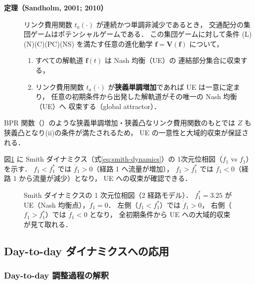 \begin{description}
  \item[\textbf{定理（Sandholm, 2001; 2010）}]
    リンク費用関数 $t_a(\cdot)$ が連続かつ単調非減少であるとき，
    交通配分の集団ゲームはポテンシャルゲームである．
    この集団ゲームに対して条件 (L)(N)(C)(PC)(NS) を満たす任意の進化動学
    $\dot{\boldsymbol{f}} = \boldsymbol{V}(\boldsymbol{f})$ について，
    \begin{enumerate}
      \item すべての解軌道 $\boldsymbol{f}(t)$ は Nash 均衡（UE）の
            連結部分集合に収束する，
      \item リンク費用関数 $t_a(\cdot)$ が\textbf{狭義単調増加}であれば
            UE は一意に定まり，
            任意の初期条件から出発した解軌道がその唯一の Nash 均衡（UE）へ
            収束する（global attractor）．
    \end{enumerate}
    \cite{Sandholm2001,Sandholm2010}
\end{description}

BPR 関数（）のような狭義単調増加・狭義凸なリンク費用関数のもとでは
$Z$ も狭義凸となり(ii)の条件が満たされるため，
UE の一意性と大域的収束が保証される\cite{土木学会1998}．

図\ref{fig:smith-dynamics} に Smith ダイナミクス（式\eqref{eq:smith-dynamics}）の
1次元位相図（$\dot{f}_1$ vs $f_1$）を示す．
$f_1 < f_1^*$ では $\dot{f}_1 > 0$（経路 1 へ流量が増加），
$f_1 > f_1^*$ では $\dot{f}_1 < 0$（経路 1 から流量が減少）となり，
UE への収束が確認できる．

\begin{figure}[hbtp]
  \centering
  
  \caption{Smith ダイナミクスの 1 次元位相図（2 経路モデル）．
           $f_1^* = 3.25$ がUE（Nash 均衡点），$\dot{f}_1 = 0$．
           左側（$f_1 < f_1^*$）では $\dot{f}_1 > 0$，
           右側（$f_1 > f_1^*$）では $\dot{f}_1 < 0$ となり，
           全初期条件から UE への大域的収束が見て取れる．}
  \label{fig:smith-dynamics}
\end{figure}

\subsection{Day-to-day ダイナミクスへの応用}
\label{subsec:daytodaydyn}

\subsubsection*{Day-to-day 調整過程の解釈}

